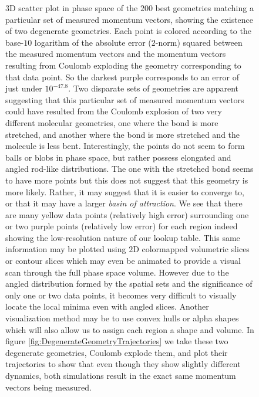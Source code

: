 \begin{figure}
  {3D scatter plot in phase space of the $200$ best geometries matching a particular set of measured momentum vectors, showing the existence of two degenerate geometries. Each point is colored according to the base-$10$ logarithm of the absolute error ($2$-norm) squared between the measured momentum vectors and the momentum vectors resulting from Coulomb exploding the geometry corresponding to that data point. So the darkest purple corresponds to an error of just under $10^{-47.8}$. Two disparate sets of geometries are apparent suggesting that this particular set of measured momentum vectors could have resulted from the Coulomb explosion of two very different molecular geometries, one where the  bond is more stretched, and another where the  bond is more stretched and the molecule is less bent. Interestingly, the points do not seem to form balls or blobs in phase space, but rather possess elongated and angled rod-like distributions. The one with the stretched  bond seems to have more points but this does not suggest that this geometry is more likely. Rather, it may suggest that it is easier to converge to, or that it may have a larger \emph{basin of attraction}. We see that there are many yellow data points (relatively high error) surrounding one or two purple points (relatively low error) for each region indeed showing the low-resolution nature of our lookup table. This same information may be plotted using $2$D colormapped volumetric slices or contour slices which may even be animated to provide a visual scan through the full phase space volume. However due to the angled distribution formed by the spatial sets and the significance of only one or two data points, it becomes very difficult to visually locate the local minima even with angled slices. Another visualization method may be to use convex hulls or alpha shapes which will also allow us to assign each region a shape and volume. In figure \ref{fig:DegenerateGeometryTrajectories} we take these two degenerate geometries, Coulomb explode them, and plot their trajectories to show that even though they show slightly different dynamics, both simulations result in the exact same momentum vectors being measured.}
  \label{fig:rainbow}
\end{figure}


